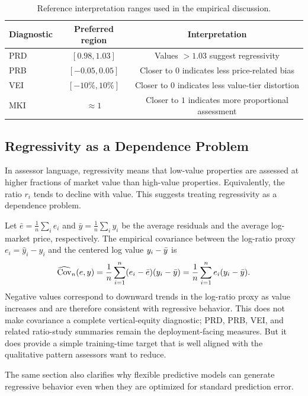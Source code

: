 \documentclass[12pt]{article}
\theoremstyle{plain}
\theoremstyle{definition}
\newcommand{\Cov}{\operatorname{Cov}}
\begin{document}
\begin{table}[t]
\centering
\caption{Reference interpretation ranges used in the empirical discussion.}
\label{tab:reference_ranges}
\begin{tabular}{lcc}
\toprule
Diagnostic & Preferred region & Interpretation \\
\midrule
PRD & \([0.98,1.03]\) & Values \(>1.03\) suggest regressivity \\
PRB & \([-0.05,0.05]\) & Closer to \(0\) indicates less price-related bias \\
VEI & \([-10\%,10\%]\) & Closer to \(0\) indicates less value-tier distortion \\
MKI & \(\approx 1\) & Closer to \(1\) indicates more proportional assessment \\
\bottomrule
\end{tabular}
\end{table}

\subsection{Regressivity as a Dependence Problem}

In assessor language, regressivity means that low-value properties are assessed at higher fractions of market value than high-value properties. Equivalently, the ratio \(r_i\) tends to decline with value. This suggests treating regressivity as a dependence problem.

Let \(\bar e=\frac{1}{n}\sum_i e_i\) and \(\bar y=\frac{1}{n}\sum_i y_i\) be the average residuals and the average log-market price, respectively. The empirical covariance between the log-ratio proxy \(e_i=\hat y_i-y_i\) and the centered log value \(y_i - \Bar y\) is
\[
\widehat{\Cov}_n(e,y)=\frac{1}{n}\sum_{i=1}^n (e_i - \Bar{e}) (y_i - \Bar{y}) = \frac{1}{n}\sum_{i=1}^n e_i (y_i - \Bar{y}).
\]
Negative values correspond to downward trends in the log-ratio proxy as value increases and are therefore consistent with regressive behavior. This does not make covariance a complete vertical-equity diagnostic; PRD, PRB, VEI, and related ratio-study summaries remain the deployment-facing measures. But it does provide a simple training-time target that is well aligned with the qualitative pattern assessors want to reduce.

The same section also clarifies why flexible predictive models can generate regressive behavior even when they are optimized for standard prediction error.
\end{document}
